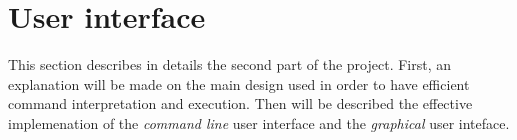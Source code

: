 \section{User interface} %
\label{sec:user_interface}
This section describes in details the second part of the project.
First, an explanation will be made on the main design used in order
to have efficient command interpretation and execution.
Then will be described the effective implemenation
of the \emph{command line} user interface and the \emph{graphical} user inteface.


\newpage

\newpage

